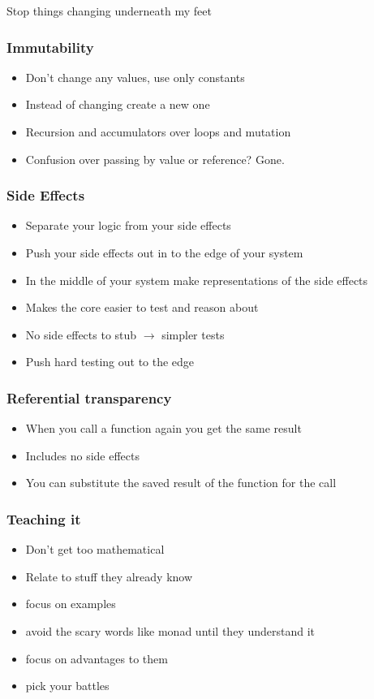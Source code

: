\documentclass{beamer}
\begin{document}
\begin{frame}
\begin{center}
\Huge Stop things changing underneath my feet
\end{center}
\end{frame}

\begin{frame}
\frametitle{Immutability}
\begin{itemize}
\item Don't change any values, use only constants
\item Instead of changing create a new one
\item Recursion and accumulators over loops and mutation
\item Confusion over passing by value or reference? Gone.
\end{itemize}
\end{frame}

\begin{frame}
\frametitle{Side Effects}
\begin{itemize}
\item Separate your logic from your side effects
\item Push your side effects out in to the edge of your system
\item In the middle of your system make representations of the side effects
\item Makes the core easier to test and reason about
\item No side effects to stub $\rightarrow$ simpler tests
\item Push hard testing out to the edge
\end{itemize}
\end{frame}

\begin {frame}
\frametitle{Referential transparency}
\begin{itemize}
\item When you call a function again you get the same result
\item Includes no side effects
\item You can substitute the saved result of the function for the call
\end{itemize}
\end{frame}

\begin{frame}
\frametitle{Teaching it}
\begin{itemize}
\item Don't get too mathematical
\item Relate to stuff they already know
\item focus on examples
\item avoid the scary words like monad until they understand it
\item focus on advantages to them
\item pick your battles
\end{itemize}
\end{frame}
\end{document}
